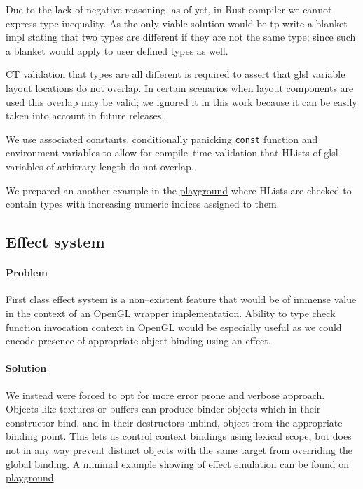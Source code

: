 Due to the lack of negative reasoning, as of yet, in Rust compiler we cannot express type inequality.
As the only viable solution would be tp write a blanket impl stating that two types are different if they are not the same type; since such a blanket would apply to user defined types as well.

CT validation that types are all different is required to assert that glsl variable layout locations do not overlap.
In certain scenarios when layout components are used this overlap may be valid; we ignored it in this work because it can be easily taken into account in future releases.

We use associated constants, conditionally panicking \texttt{const} function and environment variables to allow for compile--time validation that HLists of glsl variables 
of arbitrary length do not overlap.

We prepared an another example in the \href{https://play.rust-lang.org/?version=stable&mode=debug&edition=2021&gist=61baf4a1043d947594ef33d03bb8390b}{playground} where
HLists are checked to contain types with increasing numeric indices assigned to them.

\subsection{Effect system}

\paragraph{Problem}

First class effect system is a non--existent feature that would be of immense value in the context of an OpenGL wrapper implementation.
Ability to type check function invocation context in OpenGL would be especially useful as we could encode presence of appropriate object binding using an effect.

\paragraph{Solution}

We instead were forced to opt for more error prone and verbose approach.
Objects like textures or buffers can produce binder objects which in their constructor bind, and in their destructors unbind, object from the appropriate binding point.
This lets us control context bindings using lexical scope, but does not in any way prevent distinct objects with the same target from overriding the global binding.
A minimal example showing of effect emulation can be found on \href{https://play.rust-lang.org/?version=stable&mode=debug&edition=2021&gist=3724852e646ce5d0ed1faf0c57f3e5c1}{playground}.

